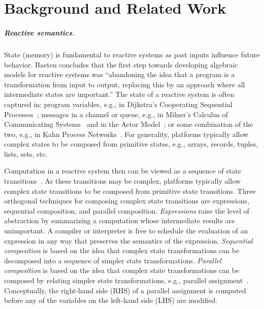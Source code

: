\chapter{Background and Related Work}
\label{background}

\paragraph{Reactive semantics.}
State (memory) is fundamental to reactive systems as past inputs influence future behavior.
Baeten concludes that the first step towards developing algebraic models for reactive systems was ``abandoning the idea that a program is a transformation from input to output, replacing this by an approach where all intermediate states are important\cite{baeten2005brief}.''
The state of a reactive system is often captured in: program variables, e.g., in Dijkstra's Cooperating Sequential Processes~\cite{dijkstra1965cooperating}; messages in a channel or queue, e.g.,  in Milner's Calculus of Communicating Systems~\cite{milner1982calculus} and in the Actor Model~\cite{agha1985actors}; or some combination of the two, e.g., in Kahn Process Networks~\cite{kahn1974semantics}.
For generality, platforms typically allow complex states to be composed from primitive states, e.g., arrays, records, tuples, lists, sets, etc.

Computation in a reactive system then can be viewed as a sequence of state transitions~\cite{pnueli1981temporal}.
As these transitions may be complex, platforms typically allow complex state transitions to be composed from primitive state transitions.
Three orthogonal techniques for composing complex state transitions are expressions, sequential composition, and parallel composition.
\emph{Expressions} raise the level of abstraction by summarizing a computation whose intermediate results are unimportant.
A compiler or interpreter is free to schedule the evaluation of an expression in any way that preserves the semantics of the expression.
\emph{Sequential composition} is based on the idea that complex state transformations can be decomposed into a sequence of simpler state transformations.
\emph{Parallel composition} is based on the idea that complex state transformations can be composed by relating simpler state transformations, e.g., parallel assignment~\cite{barron1963main}.
Conceptually, the right-hand side (RHS) of a parallel assignment is computed before any of the variables on the left-hand side (LHS) are modified.

